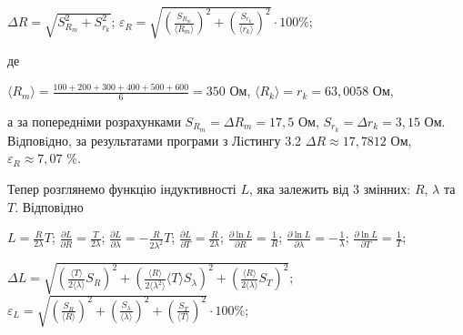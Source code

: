 \documentclass[12pt,a4paper]{article}
\begin{document}
    \begin{center}
        $\displaystyle \Delta R = \sqrt{S_{R_m}^2 + S_{r_k}^2}$;
        $\displaystyle \varepsilon_R = \sqrt{\left( \frac{S_{R_m}}{\text{⟨}R_m\text{⟩}} \right)^2 + \left( \frac{S_{r_k}}{\text{⟨}r_k\text{⟩}} \right)^2} \cdot 100 \%$;
    \end{center}

    де

    \begin{center}

        $\displaystyle \text{⟨}R_m\text{⟩} = \frac{100+200+300+400+500+600}{6} = 350$ Ом, $\text{⟨}R_k\text{⟩} = r_k = 63,0058$ Ом,

    \end{center}

    а за попередніми розрахунками $S_{R_m} = \Delta R_m = 17,5$ Ом, $S_{r_k} = \Delta r_k = 3,15$ Ом. Вiдповiдно, за результатами
    програми з Лiстингу 3.2 $\Delta R \approx 17,7812$ Ом, $\varepsilon_R \approx 7,07$ \%.

    Тепер розглянемо функцію індуктивності $L$, яка залежить від 3 змінних: $R$, $\lambda$ та $T$. Відповідно

    \begin{center}

        $\displaystyle L = \frac{R}{2\lambda}T$; $\displaystyle \frac{\partial L}{\partial R} = \frac{T}{2\lambda}$; $\displaystyle \frac{\partial L}{\partial \lambda} = -\frac{R}{2\lambda^2}T$; $\displaystyle \frac{\partial L}{\partial T} = \frac{R}{2\lambda}$;
        $\displaystyle \frac{\partial \ln L}{\partial R} = \frac{1}{R}$; $\displaystyle \frac{\partial \ln L}{\partial \lambda} = -\frac{1}{\lambda}$; $\displaystyle \frac{\partial \ln L}{\partial T} = \frac{1}{T}$;

    \end{center}

    \begin{center}

        $\displaystyle \Delta L = \sqrt{\left( \frac{\text{⟨}T\text{⟩}}{2\text{⟨}\lambda\text{⟩}} S_{R} \right)^2 + \left( \frac{\text{⟨}R\text{⟩}}{2\text{⟨}\lambda^2\text{⟩}} \text{⟨}T\text{⟩} S_{\lambda}\right)^2 + \left( \frac{\text{⟨}R\text{⟩}}{2\text{⟨}\lambda\text{⟩}} S_T \right)^2}$;
        $\displaystyle \varepsilon_L = \sqrt{\left( \frac{S_{R}}{\text{⟨}R\text{⟩}} \right)^2 + \left( \frac{S_{\lambda}}{\text{⟨}\lambda\text{⟩}} \right)^2 + \left( \frac{S_{T}}{\text{⟨}T\text{⟩}} \right)^2} \cdot 100 \%$;

    \end{center}
\end{document}
